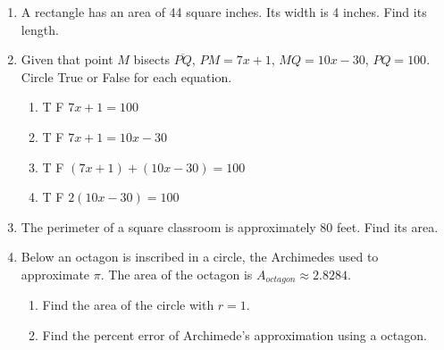 \begin{enumerate}
\item A rectangle has an area of 44 square inches. Its width is 4 inches. Find its length.
\vspace{3.0cm}

\item Given that point $M$ bisects $\overline{PQ}$, $PM=7x+1$, $MQ=10x-30$, $PQ=100$. Circle True or False for each equation.
  \begin{multicols}{2}
    \begin{enumerate}
      \item T \quad F \quad $7x+1=100$
      \item T \quad F \quad $7x+1=10x-30$
      \item T \quad F \quad $(7x+1) + (10x-30) = 100$
      \item T \quad F \quad $2(10x-30)=100$
    \end{enumerate}
  \end{multicols}

\newpage
\item The perimeter of a square classroom is approximately 80 feet. Find its area. \vspace{3cm}

\item Below an octagon is inscribed in a circle, the Archimedes used to approximate $\pi$. The area of the octagon is $A_{octagon} \approx 2.8284$.
  \begin{multicols}{2}
  \raggedcolumns
  \begin{enumerate}[itemsep=2cm]
    \item Find the area of the circle with $r=1$.
    \item Find the percent error of Archimede's approximation using a octagon.
  \end{enumerate}
  \begin{flushright}
  \end{flushright}
  \end{multicols} \vspace{1cm}


\end{enumerate}
